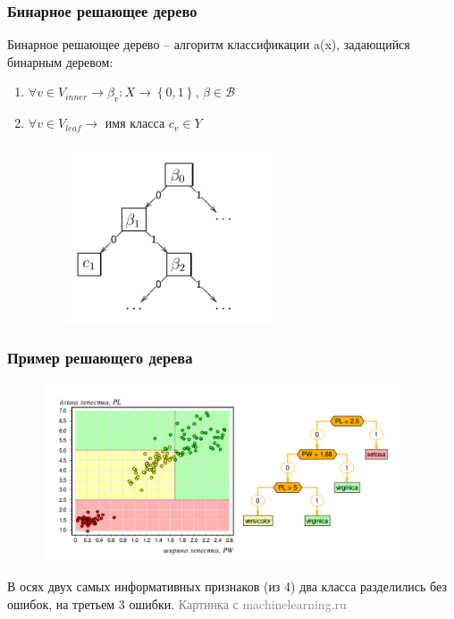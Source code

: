 \documentclass[12pt]{beamer}
\begin{document}
\begin{frame}\frametitle{Бинарное решающее дерево}
Бинарное решающее дерево -- алгоритм классификации a(x), задающийся бинарным деревом:\\
\begin{enumerate}[--]
\item $\forall v \in V_{inner} \rightarrow \beta_v: X \rightarrow \left\{ 0,1\right\}$, $\beta \in \mathcal{B}$
\item $\forall v \in V_{leaf} \rightarrow $ имя класса $c_v \in Y$\\

\begin{figure}[htbp]
  \includegraphics[height=150pt, keepaspectratio = true]{images/binary_tree}   
\end{figure}
\end{enumerate}
\end{frame}

\begin{frame}\frametitle{Пример решающего дерева}
\begin{figure}[htbp]
  \includegraphics[height=150pt, keepaspectratio = true]{images/fisher}   
\end{figure}
В осях двух самых информативных признаков (из 4)
два класса разделились без ошибок, на третьем 3 ошибки.
\footnotesize\textcolor{gray} {Картинка с machinelearning.ru}

\end{frame}
\end{document}
